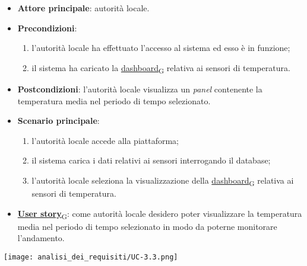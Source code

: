\newpage

\begin{itemize}
	\item \textbf{Attore principale}: autorità locale.
	\item \textbf{Precondizioni}:
	      \begin{enumerate}
		      \item l'autorità locale ha effettuato l'accesso al sistema ed esso è in funzione;
		      \item il sistema ha caricato la \href{https://7last.github.io/docs/rtb/documentazione-interna/glossario\#dashboard}{dashboard\textsubscript{G}} relativa ai sensori di temperatura.
	      \end{enumerate}
	\item \textbf{Postcondizioni}: l'autorità locale visualizza un \textit{panel} contenente la temperatura media nel periodo di tempo selezionato.
	\item \textbf{Scenario principale}:
	      \begin{enumerate}
		      \item l'autorità locale accede alla piattaforma;
		      \item il sistema carica i dati relativi ai sensori interrogando il database;
		      \item l'autorità locale seleziona la visualizzazione della \href{https://7last.github.io/docs/rtb/documentazione-interna/glossario\#dashboard}{dashboard\textsubscript{G}} relativa ai sensori di temperatura.
	      \end{enumerate}
	\item \href{https://7last.github.io/docs/rtb/documentazione-interna/glossario\#user-story}{\textbf{User story}\textsubscript{G}}: come autorità locale desidero poter visualizzare la temperatura media nel periodo di tempo selezionato
	      in modo da poterne monitorare l'andamento.
\end{itemize}
\begin{center}
	\texttt{[image: analisi\_dei\_requisiti/UC-3.3.png]}
\end{center}

\newpage

